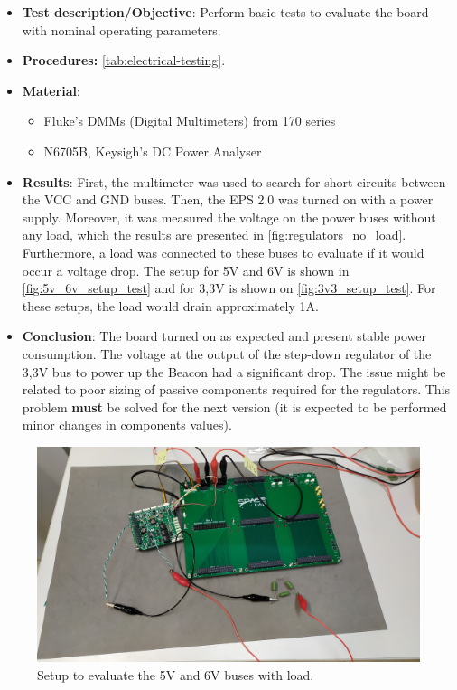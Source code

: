 \begin{itemize}
    \item \textbf{Test description/Objective}: Perform basic tests to evaluate the board with nominal operating parameters.
    \item \textbf{Procedures:} \autoref{tab:electrical-testing}.
    \item \textbf{Material}:
        \begin{itemize}
            \item Fluke's DMMs (Digital Multimeters) from 170 series
            \item N6705B, Keysigh's DC Power Analyser
        \end{itemize}
    \item \textbf{Results}: First, the multimeter was used to search for short circuits between the VCC and GND buses. Then, the EPS 2.0 was turned on with a power supply. Moreover, it was measured the voltage on the power buses without any load, which the results are presented in \autoref{fig:regulators_no_load}. Furthermore, a load was connected to these buses to evaluate if it would occur a voltage drop. The setup for 5V and 6V is shown in \autoref{fig:5v_6v_setup_test} and for 3,3V is shown on \autoref{fig:3v3_setup_test}. For these setups, the load would drain approximately 1A.
    \item \textbf{Conclusion}: The board turned on as expected and present stable power consumption. The voltage at the output of the step-down regulator of the 3,3V bus to power up the Beacon had a significant drop. The issue might be related to poor sizing of passive components required for the regulators. This problem \textbf{must} be solved for the next version (it is expected to be performed minor changes in components values).  
\end{itemize}

\begin{figure}[!ht]
    \begin{center}
        \includegraphics[width=\columnwidth]{figures/v02/5v_6v_setup_test.jpg}
        \caption{Setup to evaluate the 5V and 6V buses with load.}
        \label{fig:5v_6v_setup_test}
    \end{center}
\end{figure}

